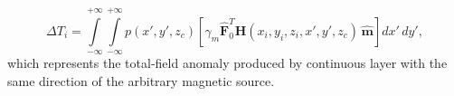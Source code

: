 \begin{equation}
\Delta T_i = \int \limits_{-\infty}^{+\infty } \int \limits_{-\infty}^{+\infty }  p(x',y',z_c)  [\gamma_m \hat{\mathbf{F}}_0^T \mathbf{H}(x_i,y_i,z_i,x',y',z_c) \,\hat{\mathbf{m}}] dx' \,dy',
\label{eq:continuous_layer_source}
\end{equation} 
which represents the total-field anomaly produced by continuous layer with the same direction of the arbitrary magnetic source.   


